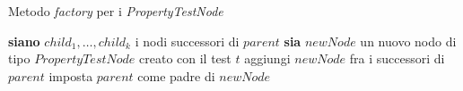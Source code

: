
\begin{algorithm}
\caption{Metodo \emph{factory} per i \emph{PropertyTestNode}}\label{alg:builder-factory-property}
\begin{algorithmic}
\State \textbf{siano} $child_1,\dots,child_k$ i nodi successori di $parent$
		\State {}
	\EndIf
\EndFor
\State \textbf{sia} $newNode$ un nuovo nodo di tipo $PropertyTestNode$ creato con il test $t$
\State aggiungi $newNode$ fra i successori di $parent$
\State imposta $parent$ come padre di $newNode$
\State {}
\EndFunction
\end{algorithmic}
\end{algorithm}
